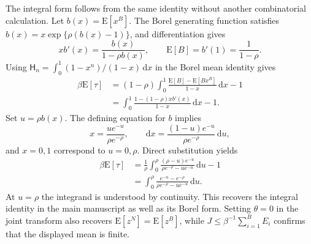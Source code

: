 \documentclass[11pt]{article}
\newcommand{\E}[1]{\mathrm{E}\left[#1\right]}
\begin{document}
The integral form follows from the same identity without another
combinatorial calculation. Let $b(x)=\E{x^B}$. The Borel generating
function satisfies $b(x)=x\exp\{\rho(b(x)-1)\}$, and differentiation
gives
\[
xb'(x)=\frac{b(x)}{1-\rho b(x)},
\qquad \E{B}=b'(1)=\frac1{1-\rho}.
\]
Using $\mathsf H_n=\int_0^1(1-x^n)/(1-x)\,\mathrm dx$ in the Borel
mean identity gives
\begin{align*}
\beta\E{\tau}
&=(1-\rho)\int_0^1
\frac{\E{B}-\E{Bx^B}}{1-x}\,\mathrm dx-1\\
&=\int_0^1\frac{1-(1-\rho)xb'(x)}{1-x}\,\mathrm dx-1.
\end{align*}
Set $u=\rho b(x)$. The defining equation for $b$ implies
\[
x=\frac{ue^{-u}}{\rho e^{-\rho}},
\qquad
\mathrm dx=\frac{(1-u)e^{-u}}{\rho e^{-\rho}}\,\mathrm du,
\]
and $x=0,1$ correspond to $u=0,\rho$. Direct substitution yields
\begin{align*}
\beta\E{\tau}
&=\frac1\rho\int_0^\rho
\frac{(\rho-u)e^{-u}}{\rho e^{-\rho}-ue^{-u}}\,\mathrm du-1\\
&=\int_0^\rho
\frac{e^{-u}-e^{-\rho}}{\rho e^{-\rho}-ue^{-u}}\,\mathrm du.
\end{align*}
At $u=\rho$ the integrand is understood by continuity. This recovers
the integral identity in the main manuscript as well as its Borel form.
Setting $\theta=0$ in the joint transform also recovers
$\E{z^N}=\E{z^B}$, while
$J\le\beta^{-1}\sum_{i=1}^B E_i$ confirms that the displayed mean is
finite.
\end{document}
